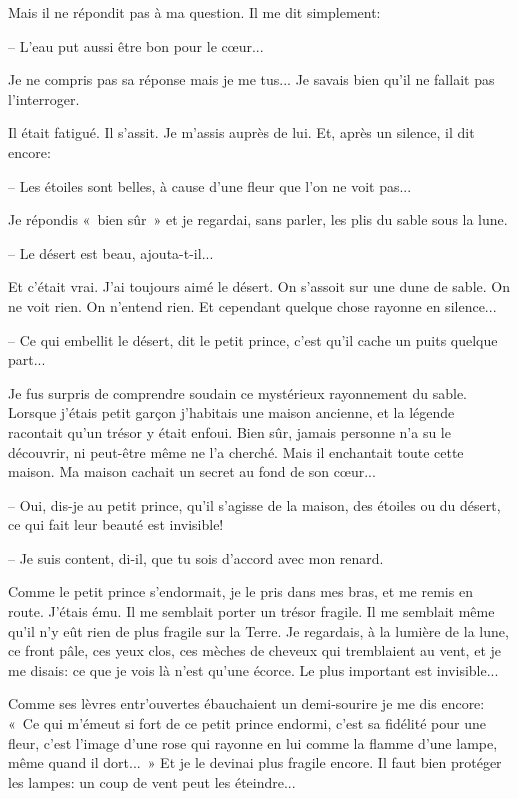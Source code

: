 \documentclass[a4paper]{report}
\begin{document}
Mais il ne répondit pas à ma question. Il me dit simplement:

-- L'eau put aussi être bon pour le cœur...

Je ne compris pas sa réponse mais je me tus... Je savais bien qu'il ne fallait pas l'interroger.

Il était fatigué. Il s'assit. Je m'assis auprès de lui. Et, après un silence, il dit encore:

-- Les étoiles sont belles, à cause d'une fleur que l'on ne voit pas...

Je répondis «~bien sûr~» et je regardai, sans parler, les plis du sable sous la lune.

-- Le désert est beau, ajouta-t-il...

Et c'était vrai. J'ai toujours aimé le désert. On s'assoit sur une dune de sable. On ne voit rien. On n'entend rien. Et cependant quelque chose rayonne en silence...

-- Ce qui embellit le désert, dit le petit prince, c'est qu'il cache un puits quelque part...

Je fus surpris de comprendre soudain ce mystérieux rayonnement du sable. Lorsque j'étais petit garçon j'habitais une maison ancienne, et la légende racontait qu'un trésor y était enfoui. Bien sûr, jamais personne n'a su le découvrir, ni peut-être même ne l'a cherché. Mais il enchantait toute cette maison. Ma maison cachait un secret au fond de son cœur...

-- Oui, dis-je au petit prince, qu'il s'agisse de la maison, des étoiles ou du désert, ce qui fait leur beauté est invisible!

-- Je suis content, di-il, que tu sois d'accord avec mon renard.

Comme le petit prince s'endormait, je le pris dans mes bras, et me remis en route. J'étais ému. Il me semblait porter un trésor fragile. Il me semblait même qu'il n'y eût rien de plus fragile sur la Terre. Je regardais, à la lumière de la lune, ce front pâle, ces yeux clos, ces mèches de cheveux qui tremblaient au vent, et je me disais: ce que je vois là n'est qu'une écorce. Le plus important est invisible...

Comme ses lèvres entr'ouvertes ébauchaient un demi-sourire je me dis encore: «~Ce qui m'émeut si fort de ce petit prince endormi, c'est sa fidélité pour une fleur, c'est l'image d'une rose qui rayonne en lui comme la flamme d'une lampe, même quand il dort...~» Et je le devinai plus fragile encore. Il faut bien protéger les lampes: un coup de vent peut les éteindre...
\end{document}
